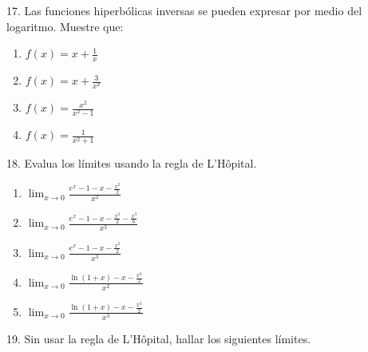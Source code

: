 \documentclass[12pt]{article}
\begin{document}
17. Las funciones hiperb\'olicas inversas se pueden expresar por medio del logaritmo. Muestre que:

\begin{enumerate}[\hspace{9px} a)]
    \item \(f(x)=x+\displaystyle\frac{1}{x}\)

    \item \(f(x)=x+\displaystyle\frac{3}{x^2}\)

    \item \(f(x)=\displaystyle\frac{x^2}{x^2-1}\)

    \item \(f(x)=\displaystyle\frac{1}{x^2+1}\)

\end{enumerate}

18. Evalua los l\'imites usando la regla de L'H\^opital.

\begin{enumerate}[\hspace{9px} a)]
    \item \(\displaystyle\lim_{x \to 0}\frac{e^x-1-x-\frac{x^2}{2}}{x^2}\)

    \item \(\displaystyle\lim_{x \to 0}\frac{e^x-1-x-\frac{x^2}{2}-\frac{x^3}{6}}{x^3}\)

    \item \(\displaystyle\lim_{x \to 0}\frac{e^x-1-x-\frac{x^2}{2}}{x^3}\)

    \item \(\displaystyle\lim_{x \to 0}\frac{\ln(1+x)-x-\frac{x^2}{2}}{x^2}\)

    \item \(\displaystyle\lim_{x \to 0}\frac{\ln(1+x)-x-\frac{x^2}{2}}{x^3}\)

\end{enumerate}

19. Sin usar la regla de L'H\^opital, hallar los siguientes l\'imites.
\end{document}
